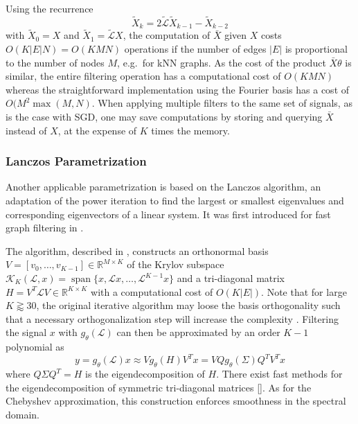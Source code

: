 \documentclass{article}
\DeclareMathOperator*{\spn}{span}
\renewcommand{\L}{\mathcal{L}}
\newcommand{\R}{\mathbb{R}}
\begin{document}
Using the recurrence
\[ \tilde{X}_k = 2\tilde{\L} \tilde{X}_{k-1} - \tilde{X}_{k-2} \] with
\(\tilde{X}_0 = X\) and \(\tilde{X}_1 = \tilde{\L} X\), the computation
of \(\bar{X}\) given \(X\) costs \(O(K|E|N) = O(KMN)\) operations if the
number of edges \(|E|\) is proportional to the number of nodes \(M\),
e.g.~for kNN graphs. As the cost of the product \(\bar{X}\theta\) is
similar, the entire filtering operation has a computational cost of
\(O(KMN)\) whereas the straightforward implementation using the Fourier
basis has a cost of \(O(M^2\max(M,N)\). When applying multiple filters
to the same set of signals, as is the case with \gls{SGD}, one may save
computations by storing and querying \(\bar{X}\) instead of \(X\), at
the expense of \(K\) times the memory.

\subsubsection{Lanczos Parametrization}\label{lanczos-parametrization}

Another applicable parametrization is based on the Lanczos algorithm, an
adaptation of the power iteration to find the largest or smallest
eigenvalues and corresponding eigenvectors of a linear system. It was
first introduced for fast graph filtering in
\citep{susnjara_accelerated_2015}.

The algorithm, described in
\citep{gallopoulos_efficient_1992, susnjara_accelerated_2015},
constructs an orthonormal basis
\(V = [v_0, \ldots, v_{K-1}] \in \R^{M \times K}\) of the Krylov
subspace \(\mathcal{K}_K(\L,x) = \spn\{ x, \L x, \ldots, \L^{K-1} x \}\)
and a tri-diagonal matrix \(H = V^T \L V \in \R^{K \times K}\) with a
computational cost of \(O(K |E|)\). Note that for large
\(K \gtrapprox 30\), the original iterative algorithm may loose the
basis orthogonality such that a necessary orthogonalization step will
increase the complexity \citep{susnjara_accelerated_2015}. Filtering the
signal \(x\) with \(g_\theta(\L)\) can then be approximated by an order
\(K-1\) polynomial as \begin{equation} y = g_\theta(\L) x \approx
V g_\theta(H) V^T x = V Q g_\theta(\Sigma) Q^T V^T x \label{eq:lanczos}\end{equation}
where \(Q \Sigma Q^T = H\) is the eigendecomposition of \(H\). There
exist fast methods for the eigendecomposition of symmetric tri-diagonal
matrices {[}{]}. As for the Chebyshev approximation, this construction
enforces smoothness in the spectral domain.
\end{document}
